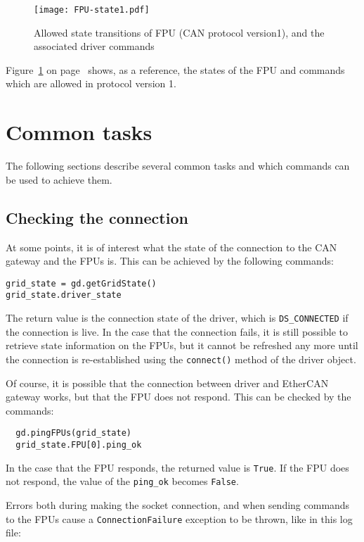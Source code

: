 \documentclass{scrartcl}[12pt,a4paper]
\begin{document}
\begin{figure}

  \texttt{[image: FPU-state1.pdf]}
  \caption{Allowed state transitions of FPU (CAN protocol version1),
    and the associated driver commands}
  \label{fig:states}
\end{figure}


Figure~\ref{fig:states} on page~\pageref{fig:states} shows, as a
reference, the states of the FPU and commands which are allowed in
protocol version 1.




\section{Common tasks}

The following sections describe several common tasks
and which commands can be used to achieve them.


\subsection{Checking the connection}

At some points, it is of interest what the state of
the connection to the CAN gateway and the FPUs is.
This can be achieved by the following commands:
\begin{verbatim}
grid_state = gd.getGridState()
grid_state.driver_state  
\end{verbatim}

The return value is the connection state of the driver, which is
\texttt{DS\_CONNECTED} if the connection is live.  In the case that the
connection fails, it is still possible to retrieve state information
on the FPUs, but it cannot be refreshed any more until the connection
is re-established using the \texttt{connect()} method of the driver
object.

Of course, it is possible that the connection between driver
and EtherCAN gateway works, but that the FPU does not
respond. This can be checked by the commands:

\begin{verbatim}
  gd.pingFPUs(grid_state)
  grid_state.FPU[0].ping_ok
\end{verbatim}

In the case that the FPU responds, the returned value is
\texttt{True}.  If the FPU does not respond, the value of the
\verb+ping_ok+ becomes \texttt{False}.

Errors both during making the socket connection, and when sending
commands to the FPUs cause a \texttt{ConnectionFailure} exception to
be thrown, like in this log file:
\end{document}
